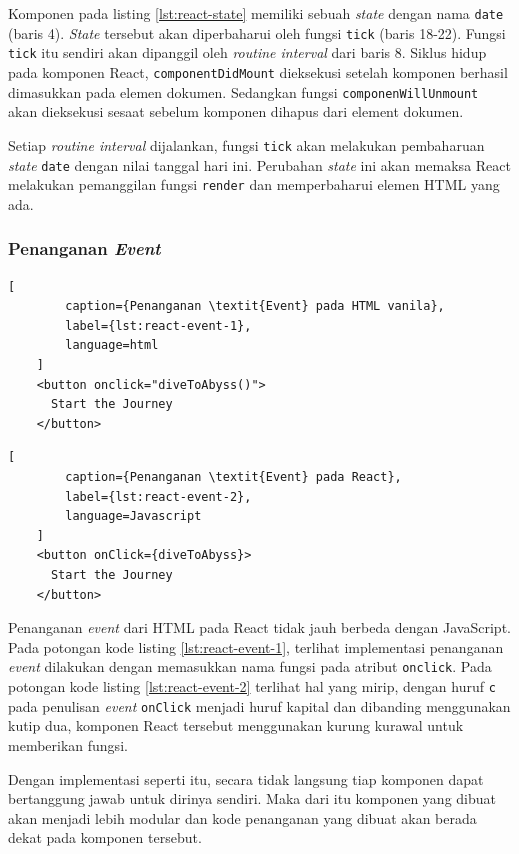     Komponen pada listing \ref{lst:react-state} memiliki sebuah \textit{state}
    dengan nama \texttt{date} (baris 4). \textit{State} tersebut akan
    diperbaharui oleh fungsi \texttt{tick} (baris 18-22). Fungsi \texttt{tick}
    itu sendiri akan dipanggil oleh \textit{routine interval} dari baris 8.
    Siklus hidup pada komponen React, \texttt{componentDidMount} dieksekusi
    setelah komponen berhasil dimasukkan pada elemen dokumen. Sedangkan fungsi
    \texttt{componenWillUnmount} akan dieksekusi sesaat sebelum komponen dihapus
    dari element dokumen.
    
    Setiap \textit{routine interval} dijalankan, fungsi \texttt{tick} akan
    melakukan pembaharuan \textit{state} \texttt{date} dengan nilai tanggal hari
    ini. Perubahan \textit{state} ini akan memaksa React melakukan pemanggilan
    fungsi \texttt{render} dan memperbaharui elemen HTML yang ada.
    
    \subsubsection{Penanganan \textit{Event}}
    \begin{lstlisting}[
        caption={Penanganan \textit{Event} pada HTML vanila}, 
        label={lst:react-event-1}, 
        language=html
    ]
    <button onclick="diveToAbyss()">
      Start the Journey
    </button>
    \end{lstlisting}
    
    \begin{lstlisting}[
        caption={Penanganan \textit{Event} pada React}, 
        label={lst:react-event-2}, 
        language=Javascript
    ]
    <button onClick={diveToAbyss}>
      Start the Journey
    </button>
    \end{lstlisting}
    
    Penanganan \textit{event} dari HTML pada React tidak jauh berbeda dengan
    JavaScript. Pada potongan kode listing \ref{lst:react-event-1}, terlihat
    implementasi penanganan \textit{event} dilakukan dengan memasukkan nama
    fungsi pada atribut \texttt{onclick}. Pada potongan kode listing
    \ref{lst:react-event-2} terlihat hal yang mirip, dengan huruf \texttt{c}
    pada penulisan \textit{event} \texttt{onClick} menjadi huruf kapital dan
    dibanding menggunakan kutip dua, komponen React tersebut menggunakan kurung
    kurawal untuk memberikan fungsi.
    
    Dengan implementasi seperti itu, secara tidak langsung tiap komponen dapat
    bertanggung jawab untuk dirinya sendiri. Maka dari itu komponen yang dibuat
    akan menjadi lebih modular dan kode penanganan yang dibuat akan berada dekat
    pada komponen tersebut.
    
